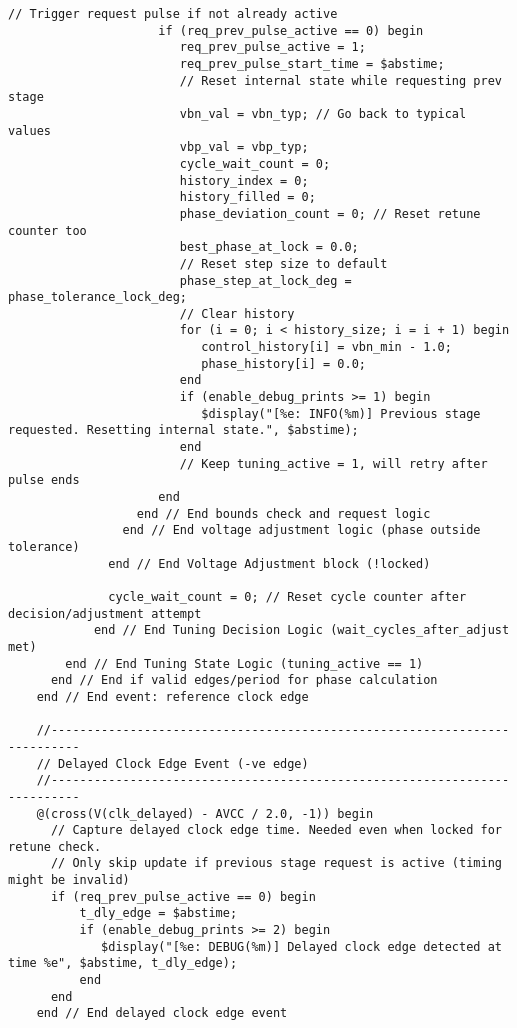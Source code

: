 \begin{lstlisting}[caption={Verilog-A Generic Vb Tuner Implementation}]
                     // Trigger request pulse if not already active
                     if (req_prev_pulse_active == 0) begin
                        req_prev_pulse_active = 1;
                        req_prev_pulse_start_time = $abstime;
                        // Reset internal state while requesting prev stage
                        vbn_val = vbn_typ; // Go back to typical values
                        vbp_val = vbp_typ;
                        cycle_wait_count = 0;
                        history_index = 0;
                        history_filled = 0;
                        phase_deviation_count = 0; // Reset retune counter too
                        best_phase_at_lock = 0.0;
                        // Reset step size to default
                        phase_step_at_lock_deg = phase_tolerance_lock_deg;
                        // Clear history
                        for (i = 0; i < history_size; i = i + 1) begin
                           control_history[i] = vbn_min - 1.0;
                           phase_history[i] = 0.0;
                        end
                        if (enable_debug_prints >= 1) begin
                           $display("[%e: INFO(%m)] Previous stage requested. Resetting internal state.", $abstime);
                        end
                        // Keep tuning_active = 1, will retry after pulse ends
                     end
                  end // End bounds check and request logic
                end // End voltage adjustment logic (phase outside tolerance)
              end // End Voltage Adjustment block (!locked)

              cycle_wait_count = 0; // Reset cycle counter after decision/adjustment attempt
            end // End Tuning Decision Logic (wait_cycles_after_adjust met)
        end // End Tuning State Logic (tuning_active == 1)
      end // End if valid edges/period for phase calculation
    end // End event: reference clock edge

    //--------------------------------------------------------------------------
    // Delayed Clock Edge Event (-ve edge)
    //--------------------------------------------------------------------------
    @(cross(V(clk_delayed) - AVCC / 2.0, -1)) begin
      // Capture delayed clock edge time. Needed even when locked for retune check.
      // Only skip update if previous stage request is active (timing might be invalid)
      if (req_prev_pulse_active == 0) begin
          t_dly_edge = $abstime;
          if (enable_debug_prints >= 2) begin
             $display("[%e: DEBUG(%m)] Delayed clock edge detected at time %e", $abstime, t_dly_edge);
          end
      end
    end // End delayed clock edge event


\end{lstlisting}
